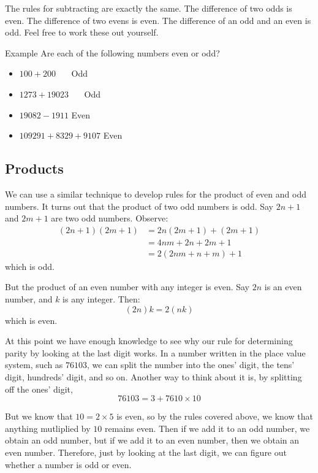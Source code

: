 \documentclass[a4paper,10pt]{report}
\begin{document}
The rules for subtracting are exactly the same. The difference of two odds is
even. The difference of two evens is even. The difference of an odd and an even
is odd. Feel free to work these out yourself.

\begin{problem}{Example}
 Are each of the following numbers even or odd?

 \begin{itemize}
  \item $100 + 200$ \hfill {}~~~Odd
  \item $1273 + 19023$ \hfill {}~~~Odd
  \item $19082 - 1911$ \hfill Even~~~
  \item $109291 + 8329 + 9107$ \hfill Even~~~
 \end{itemize}
\end{problem}

\subsection{Products}

We can use a similar technique to develop rules for the product of even and odd
numbers. It turns out that the product of two odd numbers is odd. Say $2n+1$
and $2m+1$ are two odd numbers. Observe: \begin{align*}
 (2n+1)(2m+1)
 &= 2n(2m+1) + (2m+1) \\
 &= 4nm+2n+2m+1 \\
 &= 2(2nm+n+m) + 1
\end{align*} which is odd.

But the product of an even number with any integer is even. Say $2n$ is an
even number, and $k$ is any integer. Then: \[
 (2n)k = 2(nk)
\] which is even.

At this point we have enough knowledge to see why our rule for determining
parity by looking at the last digit works. In a number written in the place
value system, such as $76103$, we can split the number into the ones' digit,
the tens' digit, hundreds' digit, and so on. Another way to think about it is,
by splitting off the ones' digit, \[
 76103 = 3 + 7610 \times 10
\]

But we know that $10=2\times5$ is even, so by the rules covered above, we know
that anything mutliplied by $10$ remains even. Then if we add it to an odd
number, we obtain an odd number, but if we add it to an even number, then we
obtain an even number. Therefore, just by looking at the last digit, we can
figure out whether a number is odd or even.
\end{document}
